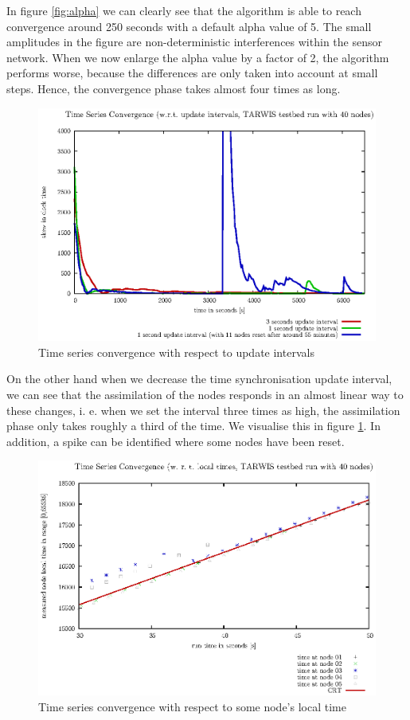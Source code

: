 \documentclass{llncs}
\begin{document}
\noindent In figure \ref{fig:alpha} we can clearly see that the algorithm is able to reach convergence around 250 seconds with a default alpha value of 5. The small amplitudes in the figure are non-deterministic interferences within the sensor network. When we now enlarge the alpha value by a factor of 2, the algorithm performs worse, because the differences are only taken into account at small steps. Hence, the convergence phase takes almost four times as long.\\
\begin{figure}[H]
	\centering
	\includegraphics[scale=0.6]{images/FIG_02.eps}
	\caption{Time series convergence with respect to update intervals}
	\label{fig:update_intervals}
\end{figure}
\noindent On the other hand when we decrease the time synchronisation update interval, we can see that the assimilation of the nodes responds in an almost linear way to these changes, i. e. when we set the interval three times as high, the assimilation phase only takes roughly a third of the time. We visualise this in figure \ref{fig:update_intervals}. In addition, a spike can be identified where some nodes have been reset.\\

\begin{figure}[H]
	\centering
	\includegraphics[scale=0.6]{images/FIG_03.eps}
	\caption{Time series convergence with respect to some node's local time}
	\label{fig:local_time}
\end{figure}
\end{document}
